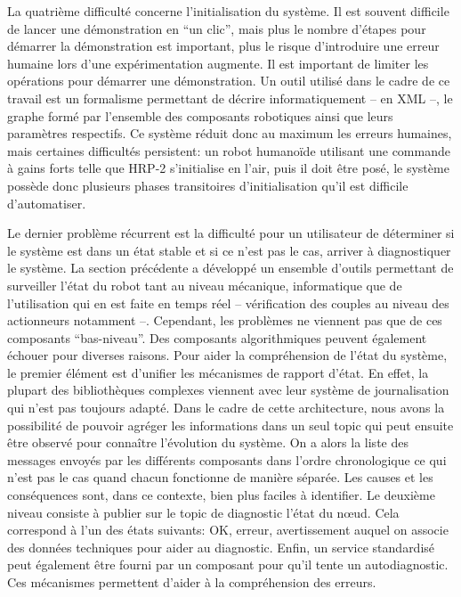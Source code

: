 La quatrième difficulté concerne l'initialisation du système. Il est
souvent difficile de lancer une démonstration en ``un clic'', mais
plus le nombre d'étapes pour démarrer la démonstration est important,
plus le risque d'introduire une erreur humaine lors d'une
expérimentation augmente. Il est important de limiter les opérations
pour démarrer une démonstration. Un outil utilisé dans le cadre de ce
travail est un formalisme permettant de décrire informatiquement -- en
XML --, le graphe formé par l'ensemble des composants
robotiques ainsi que leurs paramètres respectifs. Ce système réduit
donc au maximum les erreurs humaines, mais certaines difficultés
persistent: un robot humanoïde utilisant une commande à gains forts
telle que HRP-2 s'initialise en l'air, puis il doit être posé, le
système possède donc plusieurs phases transitoires d'initialisation
qu'il est difficile d'automatiser.


Le dernier problème récurrent est la difficulté pour un utilisateur de
déterminer si le système est dans un état stable et si ce n'est pas le
cas, arriver à diagnostiquer le système. La section précédente a
développé un ensemble d'outils permettant de surveiller l'état du
robot tant au niveau mécanique, informatique que de l'utilisation qui
en est faite en temps réel -- vérification des couples au niveau des
actionneurs notamment --. Cependant, les problèmes ne viennent pas que
de ces composants ``bas-niveau''. Des composants algorithmiques
peuvent également échouer pour diverses raisons. Pour aider la
compréhension de l'état du système, le premier élément est d'unifier
les mécanismes de rapport d'état. En effet, la plupart des
bibliothèques complexes viennent avec leur système de journalisation
qui n'est pas toujours adapté. Dans le cadre de cette architecture,
nous avons la possibilité de pouvoir agréger les informations dans un
seul topic qui peut ensuite être observé pour connaître l'évolution du
système. On a alors la liste des messages envoyés par les différents
composants dans l'ordre chronologique ce qui n'est pas le cas quand
chacun fonctionne de manière séparée. Les causes et les conséquences
sont, dans ce contexte, bien plus faciles à identifier. Le deuxième
niveau consiste à publier sur le topic de diagnostic l'état du n\oe ud.
Cela correspond à l'un des états suivants: OK, erreur,
avertissement auquel on associe des données techniques pour aider au
diagnostic. Enfin, un service standardisé peut également être fourni
par un composant pour qu'il tente un autodiagnostic. Ces mécanismes
permettent d'aider à la compréhension des erreurs.



